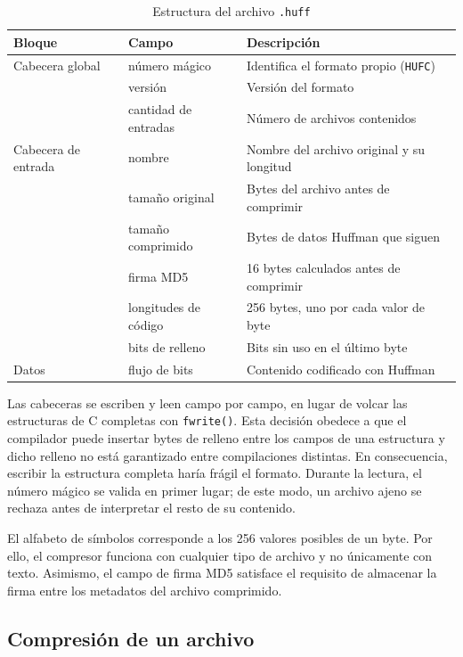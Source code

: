 \documentclass{report}
\begin{document}
\begin{table}[ht]
    \centering
    \begin{tabular}{|p{2.5cm}|p{3.1cm}|p{5.1cm}|}
        \hline
        \textbf{Bloque} & \textbf{Campo} & \textbf{Descripción} \\
        \hline
        Cabecera global & número mágico & Identifica el formato propio (\texttt{HUFC}) \\
        & versión & Versión del formato \\
        & cantidad de entradas & Número de archivos contenidos \\
        \hline
        Cabecera de entrada & nombre & Nombre del archivo original y su longitud \\
        & tamaño original & Bytes del archivo antes de comprimir \\
        & tamaño comprimido & Bytes de datos Huffman que siguen \\
        & firma MD5 & 16 bytes calculados antes de comprimir \\
        & longitudes de código & 256 bytes, uno por cada valor de byte \\
        & bits de relleno & Bits sin uso en el último byte \\
        \hline
        Datos & flujo de bits & Contenido codificado con Huffman \\
        \hline
    \end{tabular}
    \caption{Estructura del archivo \texttt{.huff}}
    \label{tab:formato}
\end{table}

Las cabeceras se escriben y leen campo por campo, en lugar de volcar las estructuras de C completas con \texttt{fwrite()}. Esta decisión obedece a que el compilador puede insertar bytes de relleno entre los campos de una estructura y dicho relleno no está garantizado entre compilaciones distintas. En consecuencia, escribir la estructura completa haría frágil el formato. Durante la lectura, el número mágico se valida en primer lugar; de este modo, un archivo ajeno se rechaza antes de interpretar el resto de su contenido.

El alfabeto de símbolos corresponde a los 256 valores posibles de un byte. Por ello, el compresor funciona con cualquier tipo de archivo y no únicamente con texto. Asimismo, el campo de firma MD5 satisface el requisito de almacenar la firma entre los metadatos del archivo comprimido.

\subsection{Compresión de un archivo}
\end{document}
